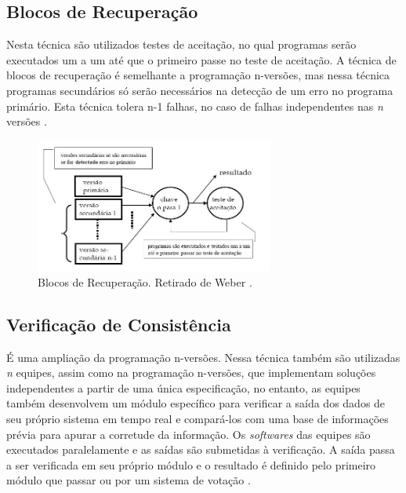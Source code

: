 \subsection{Blocos de Recuperação}

Nesta técnica são utilizados testes de aceitação, no qual programas serão executados um a um até que o primeiro passe no teste de aceitação. A técnica de blocos de recuperação é semelhante a programação n-versões, mas nessa técnica programas secundários só serão necessários na detecção de um erro no programa primário. Esta técnica tolera n-1 falhas, no caso de falhas independentes nas \textit{n} versões \cite{Nelson:1990, Weber:2002, Somani:1997}.   

\begin{figure}[H]
	\centering
	\includegraphics[width=0.7\textwidth]{figuras/blocoRecuperacao.jpg}
	\caption[Blocos de Recuperação]{Blocos de Recuperação. Retirado de Weber \cite{Weber:2002}.}
	\label{Img:blocoRecuperacao}	
\end{figure}


\subsection{Verificação de Consistência}

É uma ampliação da programação n-versões. Nessa técnica também são utilizadas \textit{n} equipes, assim como na programação n-versões, que implementam soluções independentes a partir de uma única especificação, no entanto, as equipes também desenvolvem um módulo específico para verificar a saída dos dados de seu próprio sistema em tempo real e compará-los com uma base de informações prévia para apurar a corretude da informação. Os \textit{softwares} das equipes são executados paralelamente e as saídas são submetidas à verificação. A saída passa a ser verificada em seu próprio módulo e o resultado é definido pelo primeiro módulo que passar ou por um sistema de votação \cite{Nelson:1990,Kruger:2014}.

